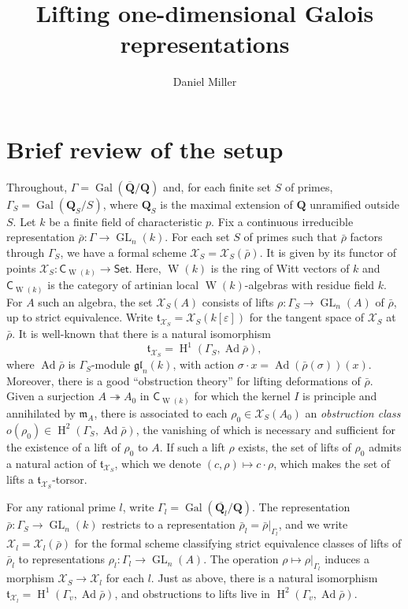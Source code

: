 \documentclass{article}
\title{Lifting one-dimensional Galois representations}
\author{Daniel Miller}
\DeclareMathOperator{\adjoint}{Ad}
\DeclareMathOperator{\galois}{Gal}
\DeclareMathOperator{\GL}{GL}
\DeclareMathOperator{\h}{H}
\DeclareMathOperator{\witt}{W}
\newcommand{\cX}{\mathcal{X}}
\newcommand{\dQ}{\mathbf{Q}}
\newcommand{\fm}{\mathfrak{m}}
\newcommand{\ft}{\mathfrak{t}}
\newcommand{\coefficient}{\mathsf{C}}
\newcommand{\epic}{\twoheadrightarrow}
\newcommand{\gl}{\mathfrak{gl}}
\newcommand{\set}{\mathsf{Set}}
\begin{document}
\maketitle





\section{Brief review of the setup}

Throughout, $\Gamma=\galois(\overline{\dQ}/\dQ)$ and, for each finite set $S$ 
of primes, $\Gamma_S=\galois(\dQ_S/S)$, where $\dQ_S$ is the maximal extension 
of $\dQ$ unramified outside $S$. Let $k$ be a finite field of characteristic 
$p$. Fix a continuous irreducible representation $\bar\rho:\Gamma\to \GL_n(k)$. 
For each set $S$ of primes such that $\bar\rho$ factors through $\Gamma_S$, we 
have a formal scheme $\cX_S=\cX_S(\bar\rho)$. It is given by its functor of 
points $\cX_S:\coefficient_{\witt(k)}\to \set$. Here, $\witt(k)$ is the ring of 
Witt vectors of $k$ and $\coefficient_{\witt(k)}$ is the category of artinian 
local $\witt(k)$-algebras with residue field $k$. For $A$ such an algebra, the 
set $\cX_S(A)$ consists of lifts $\rho:\Gamma_S\to \GL_n(A)$ of $\bar\rho$, up 
to strict equivalence. Write $\ft_{\cX_S}=\cX_S(k[\varepsilon])$ for the 
tangent space of $\cX_S$ at $\bar\rho$. It is well-known that there is a 
natural isomorphism 
\[
  \ft_{\cX_S} = \h^1(\Gamma_S,\adjoint\bar\rho) ,
\]
where $\adjoint\bar\rho$ is $\Gamma_S$-module $\gl_n(k)$, with action 
$\sigma\cdot x = \adjoint(\bar\rho(\sigma))(x)$. Moreover, there is a good 
``obstruction theory'' for lifting deformations of $\bar\rho$. Given a 
surjection $A\epic A_0$ in $\coefficient_{\witt(k)}$ for which the kernel 
$I$ is principle and annihilated by $\fm_A$, there is associated to each 
$\rho_0\in \cX_S(A_0)$ an \emph{obstruction class} 
$o(\rho_0)\in \h^2(\Gamma_S,\adjoint\bar\rho)$, the vanishing of which is 
necessary and sufficient for the existence of a lift of $\rho_0$ to 
$A$. If such a lift $\rho$ exists, the set of lifts of $\rho_0$ admits a 
natural action of $\ft_{\cX_S}$, which we denote 
$(c,\rho)\mapsto c\cdot \rho$, which makes the set of lifts a 
$\ft_{\cX_S}$-torsor. 

For any rational prime $l$, write $\Gamma_l=\galois(\overline{\dQ_l}/\dQ)$. 
The representation $\bar\rho:\Gamma_S\to \GL_n(k)$ restricts to a 
representation $\bar\rho_l=\bar\rho|_{\Gamma_l}$, and we write 
$\cX_l=\cX_l(\bar\rho)$ for the formal scheme classifying strict 
equivalence classes of lifts of $\bar\rho_l$ to representations 
$\rho_l:\Gamma_l\to \GL_n(A)$. The operation 
$\rho\mapsto \rho|_{\Gamma_l}$ induces a morphism $\cX_S\to \cX_l$ for each 
$l$. Just as above, there is a natural isomorphism 
$\ft_{\cX_l} = \h^1(\Gamma_v,\adjoint\bar\rho)$, and obstructions to lifts 
live in $\h^2(\Gamma_v,\adjoint\bar\rho)$. 
\end{document}
